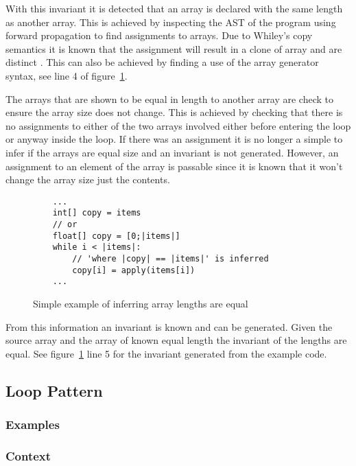

With this invariant it is detected that an array is declared with the same
length as another array.
This is achieved by inspecting the AST of the program
using forward propagation to find assignments to arrays.
Due to Whiley's copy semantics it is known that the assignment will result
in a clone of array and are distinct \cite{whiley-origin} \cite{whiley-arrays}.
This can also be achieved by finding a use of the array
generator syntax, see line 4 of figure~\ref{lst:whiley-length}.

The arrays that are shown to be equal in length to another array are
check to ensure the array size does not change.
This is achieved by checking that there is no assignments to either
of the two arrays involved either before entering the loop or
anyway inside the loop.
If there was an assignment it is no longer a simple to infer if
the arrays are equal size and an invariant is not generated.
However, an assignment to an element of the array is passable since it
is known that it won't change the array size just the contents.

\begin{figure}[ht]
\begin{lstlisting}
    ...
    int[] copy = items
    // or
    float[] copy = [0;|items|]
    while i < |items|:
        // 'where |copy| == |items|' is inferred
        copy[i] = apply(items[i])
    ...
\end{lstlisting}
\caption{Simple example of inferring array lengths are equal}
\label{lst:whiley-length}
\end{figure}

From this information an invariant is known and can be generated.
Given the source array and the array of known equal length the
invariant of the lengths are equal.
See figure~\ref{lst:whiley-length} line 5 for the invariant generated
from the example code.

\subsection{Loop Pattern}

\subsubsection{Examples}
\subsubsection{Context}
